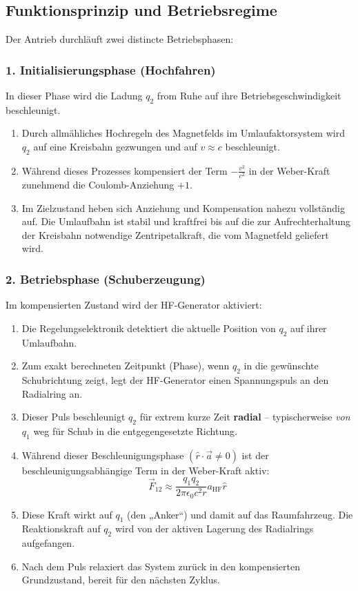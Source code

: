 \documentclass[11pt, a4paper]{article}
\begin{document}
\subsection{Funktionsprinzip und Betriebsregime}

Der Antrieb durchläuft zwei distincte Betriebsphasen:

\subsubsection*{1. Initialisierungsphase (Hochfahren)}

In dieser Phase wird die Ladung $q_2$ from Ruhe auf ihre Betriebsgeschwindigkeit beschleunigt. 
\begin{enumerate}
    \item Durch allmähliches Hochregeln des Magnetfelds im Umlaufaktorsystem wird $q_2$ auf eine Kreisbahn gezwungen und auf $v \approx c$ beschleunigt.
    \item Während dieses Prozesses kompensiert der Term $-\frac{v^2}{c^2}$ in der Weber-Kraft zunehmend die Coulomb-Anziehung $+1$.
    \item Im Zielzustand heben sich Anziehung und Kompensation nahezu vollständig auf. Die Umlaufbahn ist stabil und kraftfrei bis auf die zur Aufrechterhaltung der Kreisbahn notwendige Zentripetalkraft, die vom Magnetfeld geliefert wird.
\end{enumerate}

\subsubsection*{2. Betriebsphase (Schuberzeugung)}

Im kompensierten Zustand wird der HF-Generator aktiviert:
\begin{enumerate}
    \item Die Regelungselektronik detektiert die aktuelle Position von $q_2$ auf ihrer Umlaufbahn.
    \item Zum exakt berechneten Zeitpunkt (Phase), wenn $q_2$ in die gewünschte Schubrichtung zeigt, legt der HF-Generator einen Spannungspuls an den Radialring an.
    \item Dieser Puls beschleunigt $q_2$ für extrem kurze Zeit \textbf{radial} – typischerweise \textit{von} $q_1$ weg für Schub in die entgegengesetzte Richtung.
    \item Während dieser Beschleunigungsphase $(\hat{r} \cdot \vec{a} \neq 0)$ ist der beschleunigungsabhängige Term in der Weber-Kraft aktiv:
    \[
    \vec{F}_{12} \approx \frac{q_{1}q_{2}}{2\pi\epsilon_{0} c^{2} r}  a_{\text{HF}}  \hat{r}
    \]
    \item Diese Kraft wirkt auf $q_1$ (den „Anker“) und damit auf das Raumfahrzeug. Die Reaktionskraft auf $q_2$ wird von der aktiven Lagerung des Radialrings aufgefangen.
    \item Nach dem Puls relaxiert das System zurück in den kompensierten Grundzustand, bereit für den nächsten Zyklus.
\end{enumerate}
\end{document}
